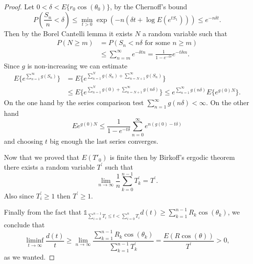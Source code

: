 \begin{proof}
Let $0<\delta<E\lbrace r_0\cos(\theta_0)\rbrace$, by the Chernoff's bound
$$P(\frac{S_n}{n}<\delta)\leq \min_{t>0}\exp(-n(\delta t+\log E(e^{tS_1})))\leq e^{-n\delta t }.$$ Then by the Borel Cantelli lemma it exists $N$ a random variable such that
\begin{align*}
P(N\geq m)&=P(S_n<n\delta\mbox{ for some }n\geq m)\\
&\leq\sum_{n=m}^{\infty}e^{-\delta t n}=\frac{1}{1-e^{-t\delta}} e^{-t\delta m}.
\end{align*}
Since $g$ is non-increasing we can estimate
\begin{align*}
E\lbrace e^{\sum_{n=1}^\infty g(S_n)}\rbrace&=E\lbrace e^{\sum_{n=1}^N g(S_n)+\sum_{n=N+1}^\infty g(S_n)}\rbrace\\
&\leq E\lbrace e^{\sum_{n=1}^N g(0)+\sum_{n=N+1}^\infty g(n\delta)}\rbrace\leq e^{\sum_{n=1}^\infty g(n\delta)}E\lbrace e^{g(0)N}\rbrace.
\end{align*}
On the one hand by the series comparison test $\sum_{n=1}^\infty g(n\delta)<\infty$.
On the other hand 
$$Ee^{g(0)N}\leq \frac{1}{1-e^{-t\delta}}\sum_{n=0}^\infty e^{n(g(0)-t\delta)} $$
and choosing $t$ big enough the last series converges.

Now that we proved that $E(T'_0)$ is finite then by Birkoff's ergodic theorem there exists a random variable $T^{'}$ such that
$$\lim_{n\rightarrow\infty}\frac{1}{n}\sum_{k=0}^{n-1}T^{'}_k=T^{'}. $$ Also since $T^{'}_i\geq 1$ then $T^{'} \geq 1$. 

Finally from the fact that $\mathds{1}_{\sum_{i=0}^{n-1}T_i\leq t<\sum_{i=0}^n T_i }d(t)\geq \sum_{k=1}^{n-1}R_k\cos(\theta_k)$, we conclude that
$$\liminf_{t\rightarrow\infty}\frac{d(t)}{t}\geq \lim_{n\rightarrow\infty} \frac{\sum_{k=1}^{n-1}R_k\cos(\theta_k)}{\sum_{k=1}^{n-1}T^{'}_k}=\frac{E(R\cos(\theta))}{T^{'}}>0, $$
as we wanted.

\end{proof}
